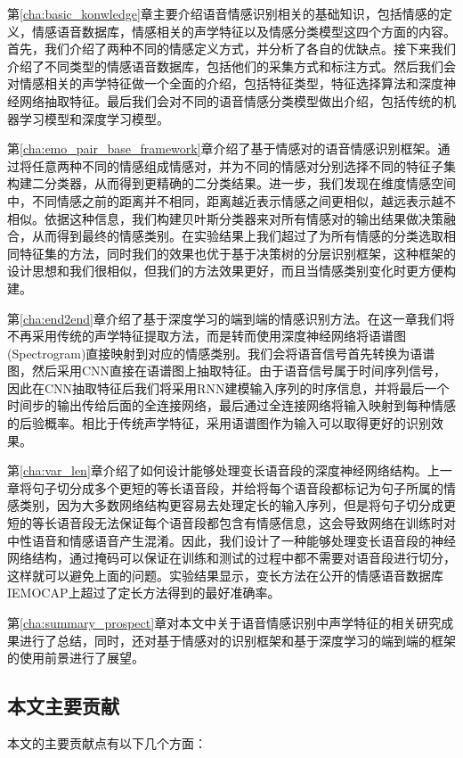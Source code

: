  第\ref{cha:basic_konwledge}章主要介绍语音情感识别相关的基础知识，包括情感的定义，情感语音数据库，情感相关的声学特征以及情感分类模型这四个方面的内容。首先，我们介绍了两种不同的情感定义方式，并分析了各自的优缺点。接下来我们介绍了不同类型的情感语音数据库，包括他们的采集方式和标注方式。然后我们会对情感相关的声学特征做一个全面的介绍，包括特征类型，特征选择算法和深度神经网络抽取特征。最后我们会对不同的语音情感分类模型做出介绍，包括传统的机器学习模型和深度学习模型。

 第\ref{cha:emo_pair_base_framework}章介绍了基于情感对的语音情感识别框架。通过将任意两种不同的情感组成情感对，并为不同的情感对分别选择不同的特征子集构建二分类器，从而得到更精确的二分类结果。进一步，我们发现在维度情感空间中，不同情感之前的距离并不相同，距离越近表示情感之间更相似，越远表示越不相似。依据这种信息，我们构建贝叶斯分类器来对所有情感对的输出结果做决策融合，从而得到最终的情感类别。在实验结果上我们超过了为所有情感的分类选取相同特征集的方法，同时我们的效果也优于基于决策树的分层识别框架，这种框架的设计思想和我们很相似，但我们的方法效果更好，而且当情感类别变化时更方便构建。

 第\ref{cha:end2end}章介绍了基于深度学习的端到端的情感识别方法。在这一章我们将不再采用传统的声学特征提取方法，而是转而使用深度神经网络将语谱图(Spectrogram)直接映射到对应的情感类别。我们会将语音信号首先转换为语谱图，然后采用CNN直接在语谱图上抽取特征。由于语音信号属于时间序列信号，因此在CNN抽取特征后我们将采用RNN建模输入序列的时序信息，并将最后一个时间步的输出传给后面的全连接网络，最后通过全连接网络将输入映射到每种情感的后验概率。相比于传统声学特征，采用语谱图作为输入可以取得更好的识别效果。
 
 第\ref{cha:var_len}章介绍了如何设计能够处理变长语音段的深度神经网络结构。上一章将句子切分成多个更短的等长语音段，并给将每个语音段都标记为句子所属的情感类别，因为大多数网络结构更容易去处理定长的输入序列，但是将句子切分成更短的等长语音段无法保证每个语音段都包含有情感信息，这会导致网络在训练时对中性语音和情感语音产生混淆。因此，我们设计了一种能够处理变长语音段的神经网络结构，通过掩码可以保证在训练和测试的过程中都不需要对语音段进行切分，这样就可以避免上面的问题。实验结果显示，变长方法在公开的情感语音数据库IEMOCAP上超过了定长方法得到的最好准确率。

 第\ref{cha:summary_prospect}章对本文中关于语音情感识别中声学特征的相关研究成果进行了总结，同时，还对基于情感对的识别框架和基于深度学习的端到端的框架的使用前景进行了展望。

\subsection{本文主要贡献}
\label{ssec:contribution}
本文的主要贡献点有以下几个方面：

